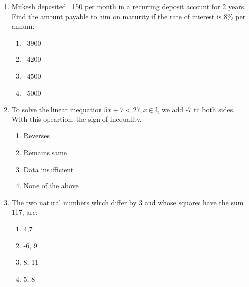 \begin{enumerate}[label=(\roman*)]

    \item Mukesh deposited \rupee~150 per month in a recurring deposit
        account for 2 years. Find the amount payable to him on maturity if the 
        rate of interest is 8\% per annum.

        \begin{multicols}{2}
        \begin{enumerate}[label=(\alph*)]
            \item \rupee~3900 
            \item \rupee~4200
            \item \rupee~4500
            \item \rupee~5000
        \end{enumerate}
        \end{multicols}

    \newpage
    \item To solve the linear inequation $5x + 7 < 27, x \in \mathbb{I}$, we add
        -7 to both sides. With this opeartion, the sign of inequality.

        \begin{multicols}{2}
        \begin{enumerate}[label=(\alph*)]
            \item Reverses 
            \item Remains same
            \item Data insufficient
            \item None of the above
        \end{enumerate}
        \end{multicols}

    \item The two natural numbers which differ by 3 and whose squares
        have the sum 117, are:

        \begin{multicols}{2}
        \begin{enumerate}[label=(\alph*)]
            \item 4,7 
            \item -6, 9
            \item 8, 11
            \item 5, 8
        \end{enumerate}
        \end{multicols}


\end{enumerate}
